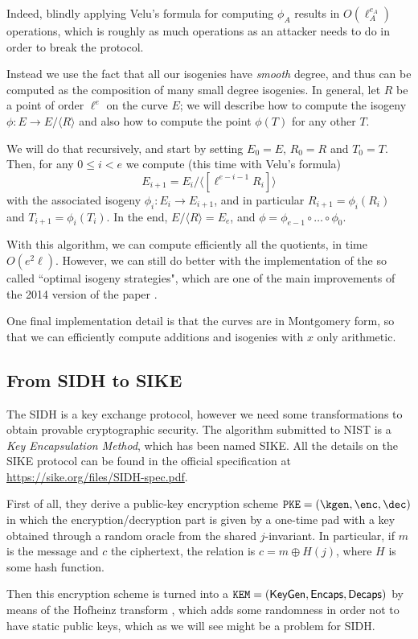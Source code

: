 Indeed, blindly applying Velu's formula for computing $\phi_A$ results in $O(\ell_A^{e_A})$ operations, which is roughly as much operations as an attacker needs to do in order to break the protocol.

Instead we use the fact that all our isogenies have \emph{smooth} degree, and thus can be computed as the composition of many small degree isogenies. In general, let $R$ be a point of order $\ell^e$ on the curve $E$; we will describe how to compute the isogeny $\phi:E\to E/\langle R\rangle$ and also how to compute the point $\phi(T)$ for any other $T$.

We will do that recursively, and start by setting $E_0=E$, $R_0=R$ and $T_0=T$. Then, for any $0\le i<e$ we compute (this time with Velu's formula) $$E_{i+1}=E_i/\langle [\ell^{e-i-1}R_i] \rangle$$ with the associated isogeny $\phi_i:E_i\to E_{i+1}$, and in particular $R_{i+1}=\phi_i(R_i)$ and $T_{i+1}=\phi_i(T_i)$. In the end, $E/\langle R \rangle=E_e$, and $\phi=\phi_{e-1}\circ\dots\circ\phi_0$.

With this algorithm, we can compute efficiently all the quotients, in time $O(e^2\ell)$. However, we can still do better with the implementation of the so called ``optimal isogeny strategies", which are one of the main improvements of the 2014 version of the paper \cite{SIDH14}.

One final implementation detail is that the curves are in Montgomery form, so that we can efficiently compute additions and isogenies with $x$ only arithmetic.

\subsection{From SIDH to SIKE}
The SIDH is a key exchange protocol, however we need some transformations to obtain provable cryptographic security. The algorithm submitted to NIST is a \emph{Key Encapsulation Method}, which has been named SIKE. All the details on the SIKE protocol can be found in the official specification at \url{https://sike.org/files/SIDH-spec.pdf}.

First of all, they derive a public-key encryption scheme $\texttt{PKE}=(\kgen,\enc,\dec)$ in which the encryption/decryption part is given by a one-time pad with a key obtained through a random oracle from the shared $j$-invariant. In particular, if $m$ is the message and $c$ the ciphertext, the relation is $c=m\oplus H(j)$, where $H$ is some hash function.

Then this encryption scheme is turned into a $\texttt{KEM}=(\mathsf{KeyGen}, \mathsf{Encaps}, \mathsf{Decaps})$ by means of the Hofheinz transform \cite{Hofheinz}, which adds some randomness in order not to have static public keys, which as we will see might be a problem for SIDH.

